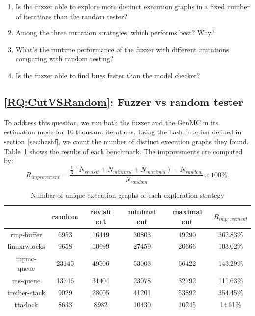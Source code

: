 \begin{enumerate}[label=RQ\arabic*,resume]
	\item Is the fuzzer able to explore more distinct execution graphs in a fixed number of iterations than the random tester? \label{RQ:CutVSRandom}
	\item Among the three mutation strategies, which performs best? Why? \label{RQ:CutComparison}
	\item What's the runtime performance of the fuzzer with different mutations, comparing with random testing? \label{RQ:GenMCOverhead}
	\item Is the fuzzer able to find bugs faster than the model checker?\label{RQ:GenMC_vs_fuzzer}
\end{enumerate}

\subsection{\ref*{RQ:CutVSRandom}: Fuzzer vs random tester }

To address this question, we run both the fuzzer and the GenMC in its estimation mode for 10 thousand iterations. Using the hash function defined in section~\ref{sec:hashf}, we count the number of distinct execution graphs they found. Table~\ref{genmc:num-of-exe} shows the results of each benchmark. The improvements are computed by:
\[
	R_{improvement} = \frac{\frac{1}{3} (N_{revisit}+N_{minimal}+N_{maximal}) - N_{random} }{N_{random}} \times 100 \%.
\]

\begin{table}[h!]
	\centering
	\begin{tabular}{|c|cccc|c|}
		\hline
		\diagbox{Benchmark}{ Strategy} & random & revisit cut & minimal cut & maximal cut & $R_{improvement}$ \\ \hline
		ring-buffer                    & 6953   & 16449       & 30803       & 49290       & 362.83\%          \\ \hline
		linuxrwlocks                   & 9658   & 10699       & 27459       & 20666       & 103.02\%          \\ \hline
		mpmc-queue                     & 23145  & 49506       & 53003       & 66422       & 143.29\%          \\ \hline
		ms-queue                       & 13746  & 31404       & 23078       & 32792       & 111.63\%          \\ \hline
		treiber-stack                  & 9029   & 28005       & 41201       & 53892       & 354.45\%          \\ \hline
		ttaslock                       & 8633   & 8982        & 10430       & 10245       & 14.51\%           \\ \hline
	\end{tabular}
	\label{genmc:num-of-exe}
	\caption{Number of unique execution graphs of each exploration strategy}
\end{table}

